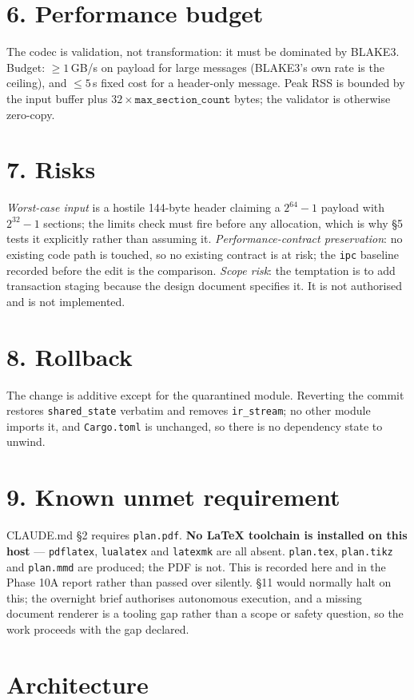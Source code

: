 \documentclass[11pt,a4paper]{article}
\begin{document}
\section*{6. Performance budget}

The codec is validation, not transformation: it must be dominated by BLAKE3.
Budget: $\ge 1$\,GB/s on payload for large messages (BLAKE3's own rate is the
ceiling), and $\le 5$\,\textmu s fixed cost for a header-only message. Peak RSS
is bounded by the input buffer plus $32 \times \texttt{max\_section\_count}$
bytes; the validator is otherwise zero-copy.

\section*{7. Risks}

\emph{Worst-case input} is a hostile 144-byte header claiming a $2^{64}-1$
payload with $2^{32}-1$ sections; the limits check must fire before any
allocation, which is why \S5 tests it explicitly rather than assuming it.
\emph{Performance-contract preservation}: no existing code path is touched, so
no existing contract is at risk; the \texttt{ipc} baseline recorded before the
edit is the comparison.
\emph{Scope risk}: the temptation is to add transaction staging because the
design document specifies it. It is not authorised and is not implemented.

\section*{8. Rollback}

The change is additive except for the quarantined module. Reverting the commit
restores \texttt{shared\_state} verbatim and removes \texttt{ir\_stream}; no
other module imports it, and \texttt{Cargo.toml} is unchanged, so there is no
dependency state to unwind.

\section*{9. Known unmet requirement}

CLAUDE.md \S2 requires \texttt{plan.pdf}. \textbf{No LaTeX toolchain is
installed on this host} --- \texttt{pdflatex}, \texttt{lualatex} and
\texttt{latexmk} are all absent. \texttt{plan.tex}, \texttt{plan.tikz} and
\texttt{plan.mmd} are produced; the PDF is not. This is recorded here and in the
Phase 10A report rather than passed over silently. \S11 would normally halt on
this; the overnight brief authorises autonomous execution, and a missing
document renderer is a tooling gap rather than a scope or safety question, so
the work proceeds with the gap declared.

\section*{Architecture}


\end{document}
